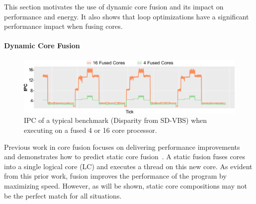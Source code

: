 This section motivates the use of dynamic core fusion and its impact on performance and energy.
It also shows that loop optimizations have a significant performance impact when fusing cores.

\paragraph{Dynamic Core Fusion}
\begin{figure}[t]
    \centering
    \includegraphics[width=\textwidth]{cases-paper/graphics/motivation/disp_opt_4_16_3.pdf}
    \caption{IPC of a typical benchmark (Disparity from SD-VBS) when executing on a fused 4 or 16 core processor.} 
    \label{fig:disp_ex}
	\vspace{1em}
\end{figure}

Previous work in core fusion focuses on delivering performance improvements~\cite{ipek2007CoreFusion,kim2007tflex} and demonstrates how to predict static core fusion~\cite{micolet2016dmpstream}.
A static fusion fuses cores into a single logical core (LC) and executes a thread on this new core.
As evident from this prior work, fusion improves the performance of the program by maximizing speed.
However, as will be shown, static core compositions may not be the perfect match for all situations.

